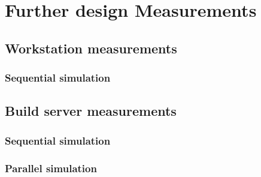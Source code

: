 \chapter{Further design Measurements}
\label{app:measurements}

\section{Workstation measurements}
\label{app:measurements_workstation}


\subsection{Sequential simulation}
\label{app:measurements_workstation_sequential}


\section{Build server measurements}
\label{app:measurements_build_server}


\subsection{Sequential simulation}
\label{app:measurements_build_server_sequential}

\subsection{Parallel simulation}
\label{app:measurements_build_server_parallel}